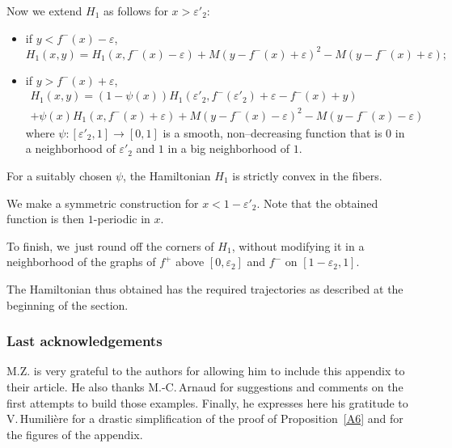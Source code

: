 \documentclass[10pt]{amsart}
\theoremstyle{definition}
\begin{document}
\begin{appendix}
Now we extend $H_1$ as follows for $x>\varepsilon'_2$:
\begin{itemize}
\item if $y< f^-(x)-\varepsilon$,
\[
H_1(x,y) = H_1(x,f^-(x)-\varepsilon) + M(y-f^-(x)+\varepsilon)^2- M(y-f^-(x)+\varepsilon);
\]
\item if $y> f^-(x)+\varepsilon$,
\begin{multline*}
H_1(x,y)=(1- \psi(x)) H_1(\varepsilon'_2,f^-(\varepsilon'_2)+\varepsilon-f^-(x)+y) \\
+\psi(x) H_1(x,f^-(x)+\varepsilon) + M(y-f^-(x)-\varepsilon)^2- M(y-f^-(x)-\varepsilon)
\end{multline*}
where $\psi : [\varepsilon'_2,1] \to [0,1]$ is a smooth, non--decreasing function that is $0$ in a neighborhood of $\varepsilon'_2$ and $1$ in a big neighborhood of $1$.
\end{itemize}
For a suitably chosen $\psi$, the Hamiltonian $H_1$ is strictly convex in the fibers.

We make a symmetric construction for $x<1-\varepsilon'_2$. Note that the obtained function is then $1$-periodic in $x$.

To finish, we~just round off the corners of $H_1$, without modifying it in a neighborhood of the graphs of $f^+$ above $[0,\varepsilon_2]$ and $f^-$ on $[1-\varepsilon_2,1]$.

The Hamiltonian thus obtained has the required trajectories as described at the beginning of the section.

\subsubsection*{Last acknowledgements}
M.Z. is very grateful to the authors for allowing him to include this appendix to their article. He also thanks M.-C.\,Arnaud for suggestions and comments on the first attempts to build those examples. Finally, he expresses here his gratitude to V.\,Humilière for a drastic simplification of the proof of Proposition~\ref{A6} and for the figures of the appendix.

\end{appendix}
\end{document}
